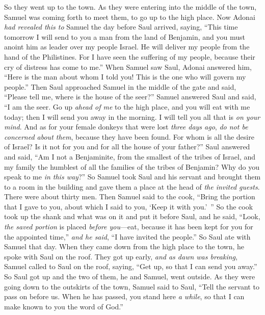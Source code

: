 \begin{biblechapter}
\verse So they went up to the town. As they were entering into the middle of the town, Samuel was coming forth to meet them, to go up to the high place.
\verse Now Adonai \textit{had revealed this to} Samuel the day before Saul arrived, saying,
\verse “This time tomorrow I will send to you a man from the land of Benjamin, and you must anoint him as leader over my people Israel. He will deliver my people from the hand of the Philistines. For I have seen the suffering of my people, because their cry of distress has come to me.”
\verse When Samuel saw Saul, Adonai answered him, “Here is the man about whom I told you! This is the one who will govern my people.”
\verse Then Saul approached Samuel in the middle of the gate and said, “Please tell me, where is the house of the seer?”
\verse Samuel answered Saul and said, “I am the seer. Go up \textit{ahead of me} to the high place, and you will eat with me today; then I will send you away in the morning. I will tell you all that is \textit{on your mind}.
\verse And as for your female donkeys that were lost \textit{three days ago}, \textit{do not be concerned about them}, because they have been found. For whom is all the desire of Israel? Is it not for you and for all the house of your father?”
\verse Saul answered and said, “Am I not a Benjaminite, from the smallest of the tribes of Israel, and my family the humblest of all the families of the tribes of Benjamin? Why do you speak to me \textit{in this way}?”
\verse So Samuel took Saul and his servant and brought them to a room in the building and gave them a place at the head of \textit{the invited guests}. There were about thirty men.
\verse Then Samuel said to the cook, “Bring the portion that I gave to you, about which I said to you, ‘Keep it with you.’ ”
\verse So the cook took up the shank and what was on it and put it before Saul, and he said, “Look, \textit{the saved portion} is placed \textit{before you}—eat, because it has been kept for you for the appointed time,” \textit{and he said}, “I have invited the people.” So Saul ate with Samuel that day.
\verse When they came down from the high place to the town, he spoke with Saul on the roof.
\verse They got up early, \textit{and as dawn was breaking}, Samuel called to Saul on the roof, saying, “Get up, so that I can send you away.” So Saul got up and the two of them, he and Samuel, went outside.
\verse As they were going down to the outskirts of the town, Samuel said to Saul, “Tell the servant to pass on before us. When he has passed, you stand here \textit{a while}, so that I can make known to you the word of God.”
\end{biblechapter}

